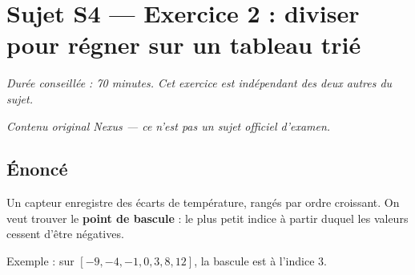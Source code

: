 \section*{Sujet S4 --- Exercice 2 : diviser pour régner sur un tableau trié}

\textit{Durée conseillée : 70 minutes. Cet exercice est indépendant des deux
autres du sujet.}

\medskip
\textit{Contenu original Nexus --- ce n'est pas un sujet officiel d'examen.}

\subsection*{Énoncé}

Un capteur enregistre des écarts de température, rangés par ordre croissant.
On veut trouver le \textbf{point de bascule} : le plus petit indice à partir
duquel les valeurs cessent d'être négatives.

Exemple : sur $[-9, -4, -1, 0, 3, 8, 12]$, la bascule est à l'indice $3$.

